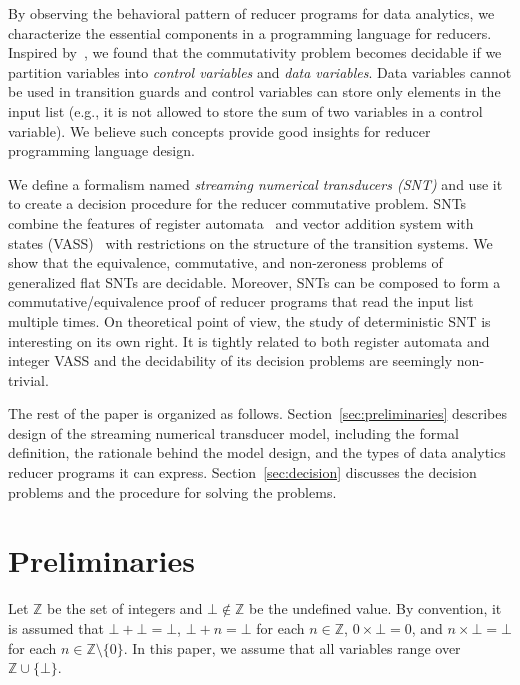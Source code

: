 \documentclass[runningheads,a4paper]{llncs}
\newcommand\intnum{{\mathbb{Z} }}
\begin{document}
By observing the behavioral pattern of reducer programs for data analytics, we characterize the essential components in a programming language for reducers. %
Inspired by~\cite{RP11}, we found that the commutativity problem becomes decidable if we partition variables into \emph{control variables} and \emph{data variables}. Data variables cannot be used in transition guards and control variables can store only elements in the input list (e.g., it is not allowed to store the sum of two variables in a control variable). 
We believe such concepts provide good insights for reducer programming language design.

We define a formalism named \emph{streaming numerical transducers (SNT)} and use it to create a decision procedure for the reducer commutative problem.
SNTs combine the features of register automata~\cite{XX} and vector addition system with states (VASS)~\cite{YY} with restrictions on the structure of the transition systems.
We show that the equivalence, commutative, and non-zeroness problems of generalized flat SNTs are decidable.
Moreover, SNTs can be composed to form a commutative/equivalence proof of reducer programs that read the input list multiple times.
On theoretical point of view, the study of deterministic SNT is
interesting on its own right. It is tightly related to both register automata and integer VASS and the decidability of its decision problems are seemingly non-trivial. 

The rest of the paper is organized as follows. Section~\ref{sec:preliminaries} describes design of the streaming numerical transducer model, including the formal definition, the rationale behind the model design, and the types of data analytics reducer programs it can express. Section~\ref{sec:decision} discusses the decision problems and the procedure for solving the problems.

\section{Preliminaries}
%
Let $\intnum$ be the set of integers and $\bot \not \in \intnum$ be 
the undefined value. By convention, it is assumed that $\bot + \bot = \bot$, $\bot + n = \bot$ for each $n \in \intnum$, $0 \times \bot = 0$, and $n \times \bot = \bot$ for each $n \in \intnum \setminus \{0\}$.
In this paper, we assume that all variables range over $\intnum \cup \{\bot\}$.  
\end{document}
